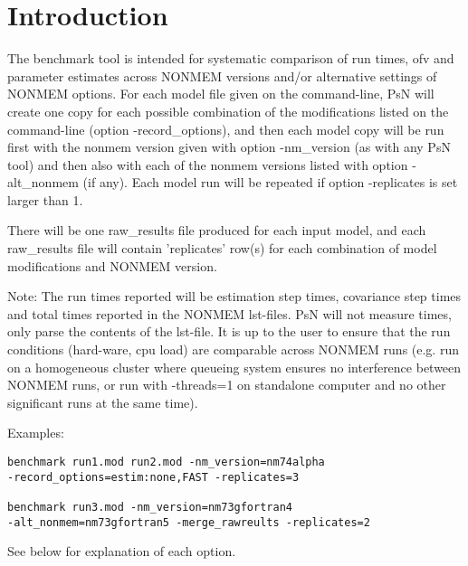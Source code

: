 




\maketitle
\newcommand{\guidetoolname}{benchmark}


\section{Introduction}
The benchmark tool is intended for systematic comparison of run times, ofv and parameter estimates
across NONMEM versions and/or alternative settings of NONMEM options.
For each model file given on the command-line, PsN will create one copy for each possible combination
of the modifications listed on the command-line (option -record\_options), and
then each model copy will be run first with the nonmem version given
with option -nm\_version (as with any PsN tool) and then also with
each of the nonmem versions listed with option -alt\_nonmem (if any).
Each model run will be repeated if option -replicates is set larger than 1.

There will be one raw\_results file produced for each input model, and each raw\_results file will contain 
'replicates' row(s)
for each combination of model modifications and NONMEM version. 

Note: The run times reported will be estimation step times, covariance step times and total times reported in the NONMEM lst-files.
PsN will not measure times, only parse the contents of the lst-file. It is up to the user to ensure that the run conditions 
(hard-ware, cpu load) are comparable across NONMEM runs (e.g. run on a homogeneous cluster where queueing system ensures no interference 
between NONMEM runs, or run with -threads=1 on standalone computer and no other significant runs at the same time).

Examples:
\begin{verbatim}
benchmark run1.mod run2.mod -nm_version=nm74alpha 
-record_options=estim:none,FAST -replicates=3

benchmark run3.mod -nm_version=nm73gfortran4 
-alt_nonmem=nm73gfortran5 -merge_rawreults -replicates=2
\end{verbatim}
See below for explanation of each option.

